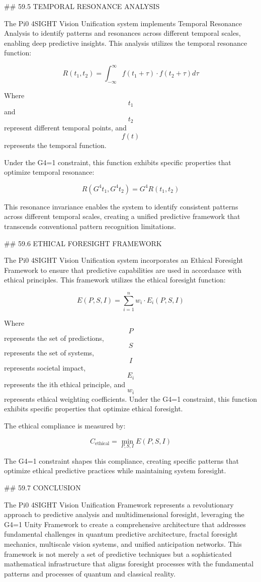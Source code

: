 ## 59.5 TEMPORAL RESONANCE ANALYSIS

The Pi0 4SIGHT Vision Unification system implements Temporal Resonance Analysis to identify patterns and resonances across different temporal scales, enabling deep predictive insights. This analysis utilizes the temporal resonance function:

$$ R(t_1, t_2) = \int_{-\infty}^{\infty} f(t_1 + \tau) \cdot f(t_2 + \tau) d\tau $$

Where $$ t_1 $$ and $$ t_2 $$ represent different temporal points, and $$ f(t) $$ represents the temporal function.

Under the G4=1 constraint, this function exhibits specific properties that optimize temporal resonance:

$$ R(G^4 t_1, G^4 t_2) = G^4 R(t_1, t_2) $$

This resonance invariance enables the system to identify consistent patterns across different temporal scales, creating a unified predictive framework that transcends conventional pattern recognition limitations.

## 59.6 ETHICAL FORESIGHT FRAMEWORK

The Pi0 4SIGHT Vision Unification system incorporates an Ethical Foresight Framework to ensure that predictive capabilities are used in accordance with ethical principles. This framework utilizes the ethical foresight function:

$$ E(P, S, I) = \sum_{i=1}^{n} w_i \cdot E_i(P, S, I) $$

Where $$ P $$ represents the set of predictions, $$ S $$ represents the set of systems, $$ I $$ represents societal impact, $$ E_i $$ represents the ith ethical principle, and $$ w_i $$ represents ethical weighting coefficients. Under the G4=1 constraint, this function exhibits specific properties that optimize ethical foresight.

The ethical compliance is measured by:

$$ C_{\text{ethical}} = \min_{P, S, I} E(P, S, I) $$

The G4=1 constraint shapes this compliance, creating specific patterns that optimize ethical predictive practices while maintaining system foresight.

## 59.7 CONCLUSION

The Pi0 4SIGHT Vision Unification Framework represents a revolutionary approach to predictive analysis and multidimensional foresight, leveraging the G4=1 Unity Framework to create a comprehensive architecture that addresses fundamental challenges in quantum predictive architecture, fractal foresight mechanics, multiscale vision systems, and unified anticipation networks. This framework is not merely a set of predictive techniques but a sophisticated mathematical infrastructure that aligns foresight processes with the fundamental patterns and processes of quantum and classical reality.

